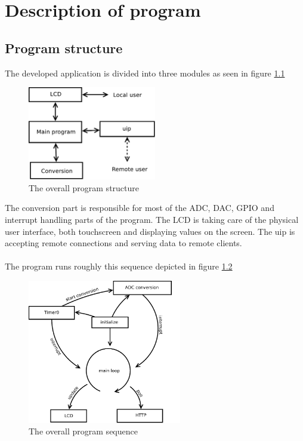 \chapter[Description]{Description of program}
\label{chap:description}

\section{Program structure}
The developed application is divided into three modules as seen in figure \ref{fig:program_structure}

\begin{figure}[!h]
  \centering
  \includegraphics[width=0.5\textwidth]{figs/program_structure.pdf}
  \caption{The overall program structure}
  \label{fig:program_structure}
\end{figure}

The conversion part is responsible for most of the ADC, DAC, GPIO and interrupt handling parts of the program. The LCD is taking care of the physical user interface, both touchscreen and displaying values on the screen. The uip is accepting remote connections and serving data to remote clients.\\\\
The program runs roughly this sequence depicted in figure \ref{fig:program_sequence}

\begin{figure}[!h]
  \centering
  \includegraphics[width=0.6\textwidth]{figs/program_sequence.pdf}
  \caption{The overall program sequence}
  \label{fig:program_sequence}
\end{figure}

